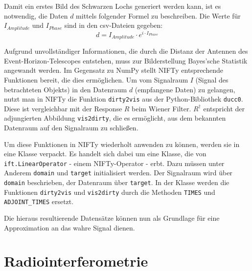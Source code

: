 Damit ein erstes Bild des Schwarzen Lochs generiert werden kann, ist es notwendig, die Daten $d$ mittels folgender Formel zu beschreiben. Die Werte für $I_{Amplitude}$ und $I_{Phase}$ sind in den csv-Dateien gegeben:
\begin{equation}
d = I_{Amplitude} \cdot e^{i \cdot I_{Phase}}
\end{equation}

Aufgrund unvollständiger Informationen, die durch die Distanz der Antennen des Event-Horizon-Telescopes entstehen, muss zur Bilderstellung Bayes'sche Statistik angewandt werden. Im Gegensatz zu NumPy stellt NIFTy entsprechende Funktionen bereit, die dies ermöglichen. Um vom Signalraum $I$ (Signal des betrachteten Objekts) in den Datenraum $d$ (empfangene Daten) zu gelangen, nutzt man in NIFTy die Funktion \verb|dirty2vis| aus der Python-Bibliothek \verb|ducc0|. Diese ist vergleichbar mit der Response $R$ beim Wiener Filter. $R^{\dagger}$ entspricht der adjungierten Abbildung \verb|vis2dirty|, die es ermöglicht, aus dem bekannten Datenraum auf den Signalraum zu schließen.

Um diese Funktionen in NIFTy wiederholt anwenden zu können, werden sie in eine Klasse verpackt. Es handelt sich dabei um eine Klasse, die von \verb|ift.LinearOperator| - einem NIFTy-Operator - erbt. Dazu müssen unter Anderem \verb|domain| und \verb|target| initialisiert werden. Der Signalraum wird über \verb|domain| beschrieben, der Datenraum über \verb|target|. In der Klasse werden die Funktionen \verb|dirty2vis| und \verb|vis2dirty| durch die Methoden \verb|TIMES| und \verb|ADJOINT_TIMES| ersetzt.

Die hieraus resultierende Datensätze können nun als Grundlage für eine Approximation an das wahre Signal dienen.



\section{Radiointerferometrie}

